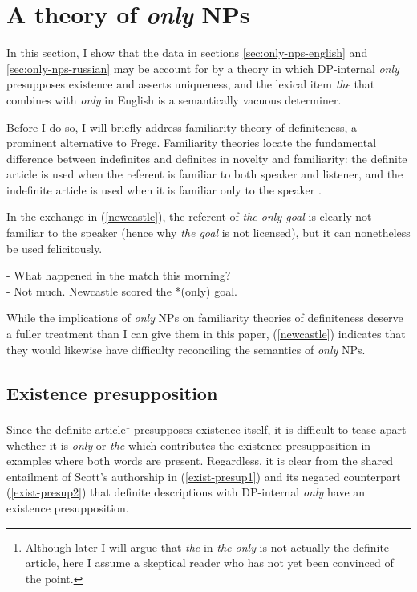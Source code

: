\section{A theory of \textit{only} NPs \label{sec:my-theory}}
In this section, I show that the data in sections \ref{sec:only-nps-english} and \ref{sec:only-nps-russian} may be account for by a theory in which DP-internal \textit{only} presupposes existence and asserts uniqueness, and the lexical item \textit{the} that combines with \textit{only} in English is a semantically vacuous determiner.

Before I do so, I will briefly address  familiarity theory of definiteness, a prominent alternative to Frege. Familiarity theories locate the fundamental difference between indefinites and definites in novelty and familiarity: the definite article is used when the referent is familiar to both speaker and listener, and the indefinite article is used when it is familiar only to the speaker \citep{heim82}.

In the exchange in (\ref{newcastle}), the referent of \textit{the only goal} is clearly not familiar to the speaker (hence why \textit{the goal} is not licensed), but it can nonetheless be used felicitously.

\begin{exe}
	\ex \label{newcastle}
	- What happened in the match this morning? \\
	- Not much. Newcastle scored the *(only) goal.
\end{exe}

While the implications of \textit{only} NPs on familiarity theories of definiteness deserve a fuller treatment than I can give them in this paper, (\ref{newcastle}) indicates that they would likewise have difficulty reconciling the semantics of \textit{only} NPs.

\subsection{Existence presupposition}
Since the definite article\footnote{Although later I will argue that \textit{the} in \textit{the only} is not actually the definite article, here I assume a skeptical reader who has not yet been convinced of the point.} presupposes existence itself, it is difficult to tease apart whether it is \textit{only} or \textit{the} which contributes the existence presupposition in examples where both words are present. Regardless, it is clear from the shared entailment of Scott's authorship in (\ref{exist-presup1}) and its negated counterpart (\ref{exist-presup2}) that definite descriptions with DP-internal \textit{only} have an existence presupposition.

